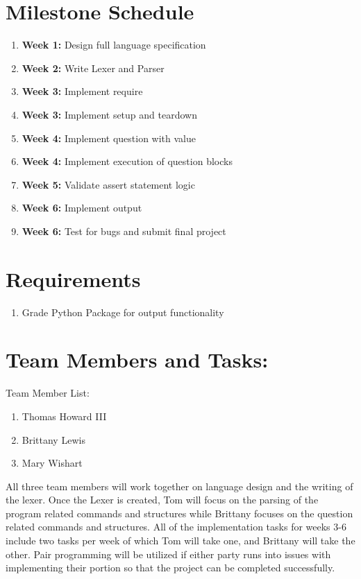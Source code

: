 \documentclass{article}
\begin{document}
    \section{Milestone Schedule}
    \begin{enumerate}
        \item {\bf Week 1:} Design full language specification
        \item {\bf Week 2:} Write Lexer and Parser
        \item {\bf Week 3:} Implement require
        \item{\bf Week 3:}  Implement setup and teardown
        \item {\bf Week 4:} Implement question with value
        \item {\bf Week 4:} Implement execution of question blocks
        \item {\bf Week 5:} Validate assert statement logic
        \item {\bf Week 6:} Implement output
        \item {\bf Week 6:} Test for bugs and submit final project
    \end{enumerate}

    \section{Requirements}
    \begin{enumerate}
        \item Grade Python Package for output functionality
    \end{enumerate}
    
    \section {Team Members and Tasks:}
    Team Member List:
    
    \begin{enumerate}
        \item Thomas Howard III
        \item Brittany Lewis
        \item Mary Wishart
    \end{enumerate}
    
    All three team members will work together on language design and the writing of the lexer. Once the Lexer is created, Tom will focus on the parsing of the program related commands and structures while Brittany focuses on the question related commands and structures. All of the implementation tasks for weeks 3-6 include two tasks per week of which Tom will take one, and Brittany will take the other. Pair programming will be utilized if either party runs into issues with implementing their portion so that the project can be completed successfully.
\end{document}
